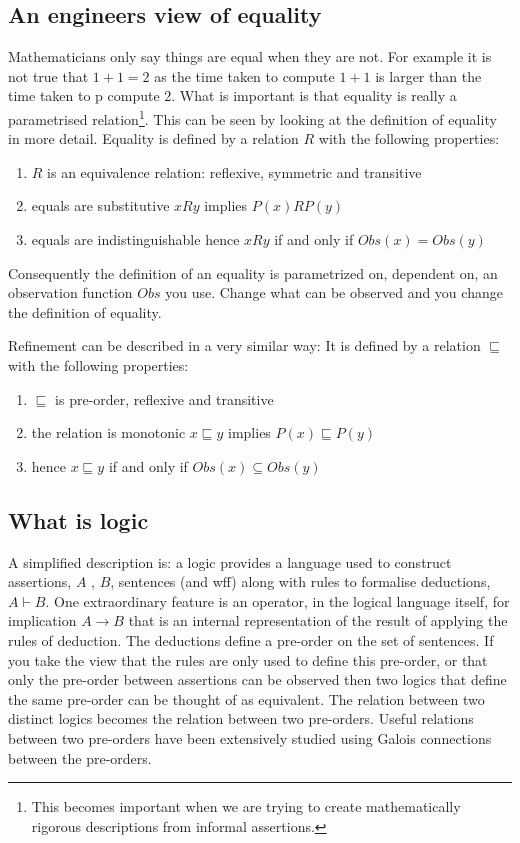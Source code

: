 \subsection{An engineers view of equality}
Mathematicians only say things are equal when they are not. For example it is not true that  $1+1=2$ as the  time taken to compute $1+1$ is larger than the  time taken to p compute $2$. What is important is that equality  is really a parametrised relation\footnote{This becomes important when we are trying to create mathematically rigorous  descriptions from  informal assertions.}. This can be seen by  looking at the definition of equality in more detail.
Equality is defined by a relation $R$ with the following properties:
\begin{enumerate}
\item $R$ is an equivalence relation: reflexive, symmetric and transitive
\item equals are substitutive   $xRy$ implies $P(x) R P(y)$
\item equals  are indistinguishable  hence $xRy$   if and only if $Obs(x)=Obs(y)$
\end{enumerate} 
Consequently the definition of an equality is parametrized on, dependent on, an observation function $Obs$ you use.
Change what can be observed and you  change the definition of equality.

Refinement can be described in a very similar way:
It is defined by a relation $\sqsubseteq$ with the following properties:
\begin{enumerate}
\item $\sqsubseteq$ is pre-order, reflexive and transitive
\item the relation is monotonic   $x\sqsubseteq y$ implies $P(x) \sqsubseteq P(y)$
\item   hence $x\sqsubseteq y$   if and only if $Obs(x)\subseteq Obs(y)$
\end{enumerate}

\subsection{What is logic}
A simplified description is: a logic provides a language used  to construct  assertions, $A$ , $B$, sentences (and wff)  along with rules to formalise deductions, $A\vdash B$. One extraordinary feature is an operator, in the logical language  itself, for implication $A\rightarrow B$ that is an internal representation of the result of applying the rules of deduction.
The deductions define a pre-order on the set of sentences. If you take the view that the rules are only used to define this pre-order, or that only the pre-order between assertions can be observed then two logics that define the same pre-order can be thought of as equivalent. The relation between two distinct logics becomes the relation between two pre-orders.  Useful  relations between two pre-orders have  been extensively studied using  Galois connections between the pre-orders.

